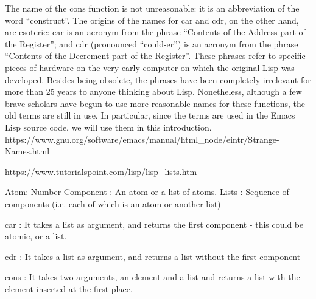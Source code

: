 
The name of the cons function is not unreasonable: it is an
abbreviation of the word “construct”. The origins of the names
for car and cdr, on the other hand, are esoteric: car is an acronym
from the phrase “Contents of the Address part of the Register”;
and cdr (pronounced “could-er”) is an acronym from the phrase
“Contents of the Decrement part of the Register”. These phrases
refer to specific pieces of hardware on the very early computer
on which the original Lisp was developed. Besides being obsolete,
the phrases have been completely irrelevant for more than 25 years to
anyone thinking about Lisp. Nonetheless, although a few brave scholars
have begun to use more reasonable names for these functions, the old
terms are still in use. In particular, since the terms are used in
the Emacs Lisp source code, we will use them in this introduction.
https://www.gnu.org/software/emacs/manual/html_node/eintr/Strange-Names.html



https://www.tutorialspoint.com/lisp/lisp_lists.htm

Atom: Number
Component : An atom or a list of atoms.
Lists : Sequence of components (i.e. each of which is an atom or another list)

car : It takes a list as argument, and returns the first component - this could be atomic, or a list.

cdr : It takes a list as argument, and returns a list without the first component 

cons : It takes two arguments, an element and a list and returns a list with the element inserted at the first place.
